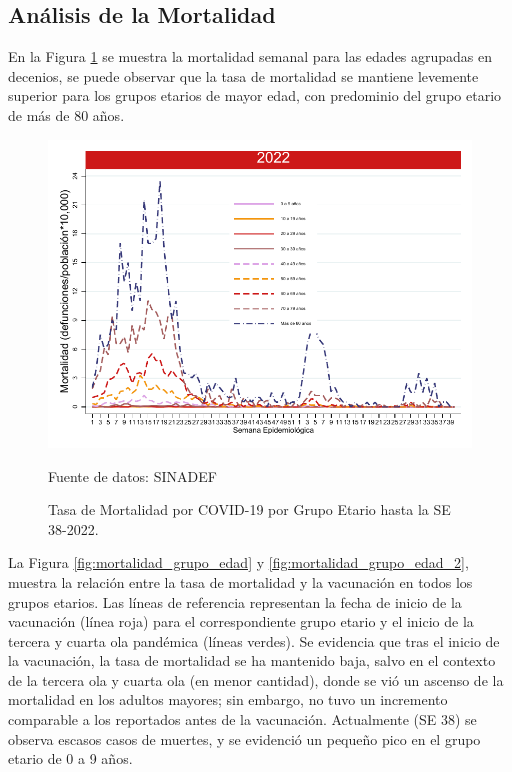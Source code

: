 \documentclass[12pt,a4paper,openany]{book}
\begin{document}
	\subsection*{Análisis de la Mortalidad}
	
	\noindent En la Figura \ref{fig:mortalidad_edad} se muestra la mortalidad semanal para las edades agrupadas en decenios,  se puede observar que la tasa de mortalidad se mantiene levemente superior para los grupos etarios de mayor edad, con predominio del grupo etario de más de 80 años.
	
	\begin{figure}[h]
		\caption{Tasa de Mortalidad por COVID-19 por Grupo Etario hasta la SE 38-2022.}\label{fig:mortalidad_edad}
		\begin{center}
			\includegraphics[width=0.65\linewidth]{../figuras/mortalidad_edad_2021_2022.pdf}
		\end{center}
		{\footnotesize Fuente de datos: SINADEF} 
	\end{figure}
	
	
	La Figura \ref{fig:mortalidad_grupo_edad} y 
	\ref{fig:mortalidad_grupo_edad_2},
	muestra la relación entre la tasa de mortalidad y la vacunación en todos los grupos etarios. Las líneas de referencia  representan la fecha de inicio de la vacunación (línea roja) para el correspondiente grupo etario y el inicio de la tercera y cuarta ola pandémica (líneas verdes). Se evidencia que tras el inicio de la vacunación, la tasa de mortalidad se ha mantenido baja, salvo en el contexto de la tercera ola y cuarta ola (en menor cantidad), donde se vió un ascenso de la mortalidad en los adultos mayores; sin embargo, no tuvo un incremento comparable a los reportados antes de la vacunación. Actualmente (SE 38) se observa escasos casos de muertes, y se evidenció un
	pequeño pico en el grupo etario de 0 a 9 años.
	
\end{document}
